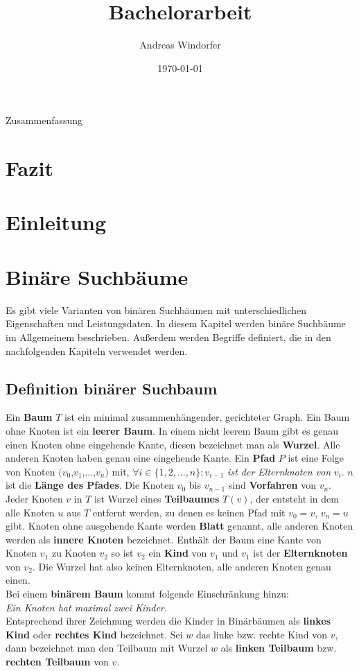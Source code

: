 \documentclass[a4paper,12pt]{article}
\title{Bachelorarbeit}
\author{
	Andreas Windorfer\\
}
\date{\today}
\begin{document}
\newtheorem{Lemma}{Lemma}[section]
\newtheorem{Satz}{Satz}[section]

\maketitle
\newpage
Zusammenfassung
\newpage
\tableofcontents
\newpage
\section{Fazit}
\newpage
\section{Einleitung}
\newpage
\section {Binäre Suchbäume}
Es gibt viele Varianten von binären Suchbäumen mit unterschiedlichen Eigenschaften und Leistungsdaten. In diesem Kapitel werden binäre Suchbäume im Allgemeinem beschrieben. Außerdem werden Begriffe definiert, die in den nachfolgenden Kapiteln verwendet werden. \\
\subsection{Definition binärer Suchbaum}
Ein \textbf{Baum} $T$ ist ein minimal zusammenhängender, gerichteter Graph. Ein Baum ohne Knoten ist ein \textbf{leerer Baum}. In einem nicht leerem Baum gibt es genau einen Knoten ohne eingehende Kante, diesen bezeichnet man als \textbf{Wurzel}. Alle anderen Knoten haben genau eine eingehende Kante.  Ein \textbf{Pfad} $P$ ist eine Folge von Knoten $(v_0$,$v_1$,...,$v_n)$ mit, $\forall i \in \{ 1, 2,..., n \} \colon v_{i-1}$ \textit{ist der Elternknoten von} $v_i$. $n$ ist die \textbf{Länge des Pfades}. Die Knoten  $v_0$ bis $v_{n-1}$ sind \textbf{Vorfahren} von $v_n$. Jeder Knoten $v$ in $T$ ist Wurzel eines \textbf{Teilbaumes} $T(v)$, der entsteht in dem alle Knoten $u$ aus $T$ entfernt werden, zu denen es keinen Pfad mit  $v_0 = v$, $v_n = u$ gibt. Knoten ohne ausgehende Kante werden \textbf{Blatt} genannt, alle anderen Knoten werden als \textbf{innere Knoten} bezeichnet. Enthält der Baum eine Kante von Knoten $v_1$ zu Knoten $v_2$ so ist $v_2$ ein \textbf{Kind} von $v_1$ und $v_1$ ist der  \textbf{Elternknoten} von $v_2$. Die Wurzel hat also keinen Elternknoten, alle anderen Knoten genau einen.\\
Bei einem \textbf{binärem Baum} kommt folgende Einschränkung hinzu:  \\
\textit{Ein Knoten hat maximal zwei Kinder.}\\ 
Entsprechend ihrer Zeichnung werden die Kinder in Binärbäumen als \textbf{linkes Kind} oder \textbf{rechtes Kind} bezeichnet. Sei $w$ das linke bzw. rechte Kind von $v$, dann bezeichnet man den Teilbaum mit Wurzel $w$ als \textbf{linken Teilbaum} bzw. \textbf{rechten Teilbaum}  von $v$.  
\end{document}
